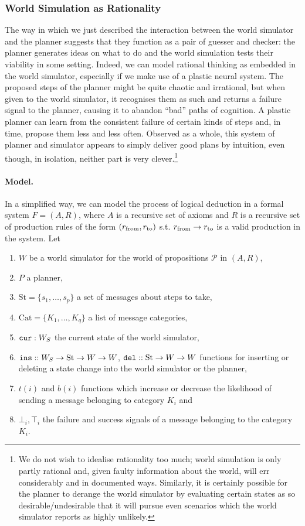 \subsubsection{World Simulation as Rationality}
The way in which we just described the interaction between the world simulator and the planner suggests that they function as a pair of guesser and checker: the planner generates ideas on what to do and the world simulation tests their viability in some setting. Indeed, we can model rational thinking as embedded in the world simulator, especially if we make use of a plastic neural system. The proposed steps of the planner might be quite chaotic and irrational, but when given to the world simulator, it recognises them as such and returns a failure signal to the planner, causing it to abandon ``bad'' paths of cognition. A plastic planner can learn from the consistent failure of certain kinds of steps and, in time, propose them less and less often. Observed as a whole, this system of planner and simulator appears to simply deliver good plans by intuition, even though, in isolation, neither part is very clever.\footnote{We do not wish to idealise rationality too much; world simulation is only partly rational and, given faulty information about the world, will err considerably and in documented ways. Similarly, it is certainly possible for the planner to derange the world simulator by evaluating certain states as so desirable/undesirable that it will pursue even scenarios which the world simulator reports as highly unlikely.}

\paragraph{Model.} In a simplified way, we can model the process of logical deduction in a formal system $F = (A, R)$, where $A$ is a recursive set of axioms and $R$ is a recursive set of production rules of the form $(r_{\textnormal{from}}, r_{\textnormal{to}})$ s.t. $r_{\textnormal{from}} \rightarrow r_{\textnormal{to}}$ is a valid production in the system. Let
	\begin{enumerate}
		\item $W$ be a world simulator for the world of propositions $\mathcal{P}$ in $(A,R)$,
		\item $P$ a planner,
		\item $\mathrm{St} = \{s_1,\dots,s_p\}$ a set of messages about steps to take,
		\item $\mathrm{Cat} = \{K_1,\dots,K_q\}$ a list of message categories,
		\item $\mathtt{cur} : W_S$ the current state of the world simulator,
		\item $\mathtt{ins} :: W_S \rightarrow \mathrm{St} \rightarrow W \rightarrow W$, $\mathtt{del} :: \mathrm{St} \rightarrow W \rightarrow W$ functions for inserting or deleting a state change into the world simulator or the planner,
		\item $t(i)$ and $b(i)$ functions which increase or decrease the likelihood of sending a message belonging to category $K_i$ and 
		\item $\bot_{i}, \top_{i}$ the failure and success signals of a message belonging to the category $K_i$.
	\end{enumerate}
	
